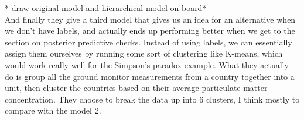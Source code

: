 \documentclass[]{article}
\begin{document}
* draw original model and hierarchical model on board*
\\

And finally they give a third model that gives us an idea for an alternative when we don't have labels, and actually ends up performing better when we get to the section on posterior predictive checks. Instead of using labels, we can essentially assign them ourselves by running some sort of clustering like K-means, which would work really well for the Simpson's paradox example. What they actually do is group all the ground monitor measurements from a country together into a unit, then cluster the countries based on their average particulate matter concentration. They choose to break the data up into 6 clusters, I think mostly to compare with the model 2.
\end{document}
